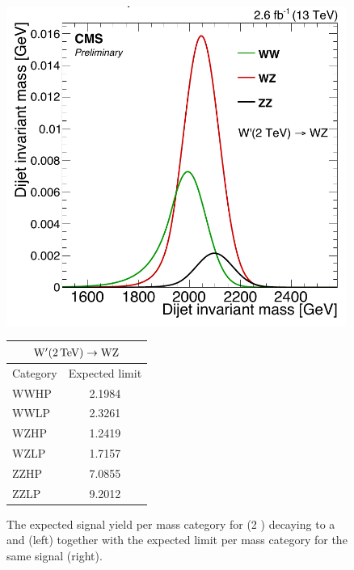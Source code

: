  \begin{figure}
 \centering
 \begin{minipage}{0.5\textwidth}
 \centering
 \includegraphics[width=0.99\textwidth]{figures/analysis/search1/misc/massCategories.pdf}
 \end{minipage}
 \begin{minipage}{0.29\textwidth}
 \centering
 \captionsetup{type=table} %
 \begin{tabular}{| l | c |}
 \hline
 \multicolumn{2}{|c|}{$\mathrm{W}^\prime (2 \,\text{Te\hspace{-.08em}V}) \rightarrow \mathrm{W}\mathrm{Z}$}\\
 \hline
 Category & Expected limit \\
 \hline
 WWHP & 2.1984 \\ 
 WWLP & 2.3261 \\ 
 WZHP & 1.2419 \\ 
 WZLP & 1.7157 \\ 
 ZZHP & 7.0855 \\ 
 ZZLP & 9.2012 \\ 
 \hline
 \end{tabular}
 \end{minipage}
 \caption{The expected signal yield per mass category for \PWpr (2 \TeV) decaying to a \PW and \PZ (left) together with the expected limit per mass category for the same signal (right).}
 \label{fig:searchI:massCatWpr}
 \end{figure}
 
